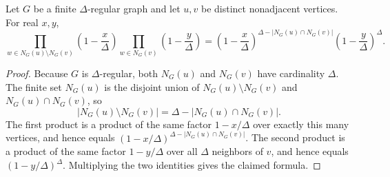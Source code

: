 \begin{helper}
Let \(G\) be a finite \(\Delta\)-regular graph and let \(u,v\) be distinct
nonadjacent vertices.  For real \(x,y\),
\[
\prod_{w\in N_G(u)\setminus N_G(v)}\left(1-\frac{x}{\Delta}\right)
\prod_{w\in N_G(v)}\left(1-\frac{y}{\Delta}\right)
=
\left(1-\frac{x}{\Delta}\right)^{\Delta-|N_G(u)\cap N_G(v)|}
\left(1-\frac{y}{\Delta}\right)^\Delta .
\]
\end{helper}
\begin{proof}
Because \(G\) is \(\Delta\)-regular, both \(N_G(u)\) and \(N_G(v)\) have
cardinality \(\Delta\).  The finite set \(N_G(u)\) is the disjoint union of
\(N_G(u)\setminus N_G(v)\) and \(N_G(u)\cap N_G(v)\), so
\[
|N_G(u)\setminus N_G(v)|=\Delta-|N_G(u)\cap N_G(v)|.
\]
The first product is a product of the same factor
\(1-x/\Delta\) over exactly this many vertices, and hence equals
\((1-x/\Delta)^{\Delta-|N_G(u)\cap N_G(v)|}\).  The second product is a product
of the same factor \(1-y/\Delta\) over all \(\Delta\) neighbors of \(v\), and
hence equals \((1-y/\Delta)^\Delta\).  Multiplying the two identities gives
the claimed formula.
\end{proof}
